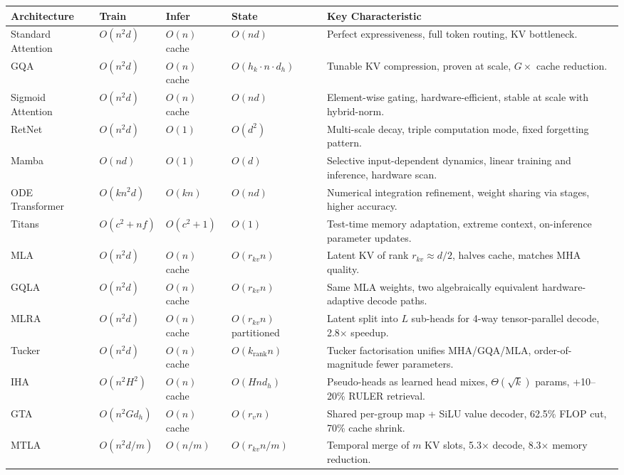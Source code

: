 \small
\begin{longtable}{p{2.0cm}p{1.8cm}p{1.6cm}p{1.6cm}p{4.5cm}}
\toprule
\textbf{Architecture} & \textbf{Train} & \textbf{Infer} & \textbf{State} & \textbf{Key Characteristic} \\
\midrule
\endhead
Standard Attention & $O(n^2 d)$ & $O(n)$ cache & $O(nd)$ & Perfect expressiveness, full token routing, KV bottleneck. \\
GQA & $O(n^2 d)$ & $O(n)$ cache & $O(h_k \cdot n \cdot d_h)$ & Tunable KV compression, proven at scale, $G \times$ cache reduction. \\
Sigmoid Attention & $O(n^2 d)$ & $O(n)$ cache & $O(nd)$ & Element-wise gating, hardware-efficient, stable at scale with hybrid-norm. \\
RetNet & $O(n^2 d)$ & $O(1)$ & $O(d^2)$ & Multi-scale decay, triple computation mode, fixed forgetting pattern. \\
Mamba & $O(nd)$ & $O(1)$ & $O(d)$ & Selective input-dependent dynamics, linear training and inference, hardware scan. \\
ODE Transformer & $O(kn^2 d)$ & $O(kn)$ & $O(nd)$ & Numerical integration refinement, weight sharing via stages, higher accuracy. \\
Titans & $O(c^2 + nf)$ & $O(c^2 + 1)$ & $O(1)$ & Test-time memory adaptation, extreme context, on-inference parameter updates. \\
MLA & $O(n^2 d)$ & $O(n)$ cache & $O(r_{kv} n)$ & Latent KV of rank $r_{kv}\!\approx\!d/2$, halves cache, matches MHA quality. \\
GQLA & $O(n^2 d)$ & $O(n)$ cache & $O(r_{kv} n)$ & Same MLA weights, two algebraically equivalent hardware-adaptive decode paths. \\
MLRA & $O(n^2 d)$ & $O(n)$ cache & $O(r_{kv} n)$ partitioned & Latent split into $L$ sub-heads for 4-way tensor-parallel decode, 2.8$\times$ speedup. \\
Tucker & $O(n^2 d)$ & $O(n)$ cache & $O(k_{\text{rank}} n)$ & Tucker factorisation unifies MHA/GQA/MLA, order-of-magnitude fewer parameters. \\
IHA & $O(n^2 H^2)$ & $O(n)$ cache & $O(H n d_h)$ & Pseudo-heads as learned head mixes, $\Theta(\sqrt{k})$ params, +10--20\% RULER retrieval. \\
GTA & $O(n^2 G d_h)$ & $O(n)$ cache & $O(r_v n)$ & Shared per-group map + SiLU value decoder, 62.5\% FLOP cut, 70\% cache shrink. \\
MTLA & $O(n^2 d / m)$ & $O(n/m)$ & $O(r_{kv} n/m)$ & Temporal merge of $m$ KV slots, 5.3$\times$ decode, 8.3$\times$ memory reduction. \\
\bottomrule
\end{longtable}
\normalsize

